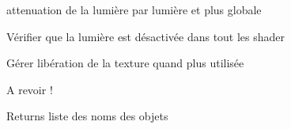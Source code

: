 
\begin{DoxyRefList}
\item[\label{todo__todo000001}%
\hypertarget{todo__todo000001}{}%
Class \hyperlink{class_light}{Light} ]attenuation de la lumière par lumière et plus globale  
\item[\label{todo__todo000002}%
\hypertarget{todo__todo000002}{}%
Member \hyperlink{class_light_ad0e59fad13bb6cfadc25b2c477e9ddc7}{Light\+:\+:$\sim$\+Light} ()]Vérifier que la lumière est désactivée dans tout les shader  
\item[\label{todo__todo000003}%
\hypertarget{todo__todo000003}{}%
Member \hyperlink{class_material_a2c19452d71f54075df8f5405b03129f4}{Material\+:\+:$\sim$\+Material} ()]Gérer libération de la texture quand plus utilisée  
\item[\label{todo__todo000004}%
\hypertarget{todo__todo000004}{}%
Member \hyperlink{class_piece_a029823aa5135b356a9e4da14578db4e8}{Piece\+:\+:get\+Children} () const ]A revoir ! \begin{DoxyReturn}{Returns}
liste des noms des objets 
\end{DoxyReturn}

\end{DoxyRefList}